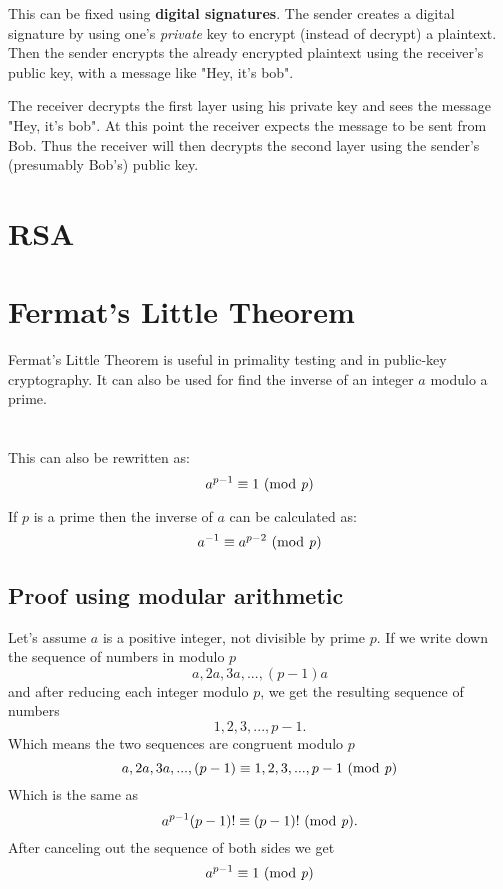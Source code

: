 \documentclass{article}
\begin{document}
	This can be fixed using \textbf{digital signatures}. The sender creates a digital signature by using one's \textit{private} key to encrypt (instead of decrypt) a plaintext. Then the sender encrypts the already encrypted plaintext using the receiver's public key, with a message like "Hey, it's bob". 
	
	The receiver decrypts the first layer using his private key and sees the message "Hey, it's bob". At this point the receiver expects the message to be sent from Bob. Thus the receiver will then decrypts the second layer using the sender's (presumably Bob's) public key. 
	
	\section*{RSA} 
	
	
	\section*{Fermat's Little Theorem} 
	Fermat's Little Theorem is useful in primality testing and in public-key cryptography. It can also be used for find the inverse of  an integer $a$ modulo a prime. \cite{fermatsummary}
	\\
	\\
	\\

	This can also be rewritten as: 
	$$
	a^{p-1} \equiv 1 \text{ (mod \textit{p})}
	$$
	
	If $p$ is a prime then the inverse of $a$ can be calculated as:
	$$
	a^{-1} \equiv a^{p-2} \text{ (mod \textit{p})}
	$$
	
 	\subsection*{Proof using modular arithmetic \cite{fermatproof}}
 	Let's assume $a$ is a positive integer, not divisible by prime $p$. If we write down the sequence of numbers in modulo $p$
 	$$
 	a,2a,3a,...,(p-1)a
 	$$
 	and after reducing each integer modulo $p$, we get the resulting sequence of numbers
 	$$
 	1,2,3,...,p-1.
 	$$
 	Which means the two sequences are congruent modulo $p$ 
 	$$
 	a,2a,3a,...,(p-1) \equiv 1,2,3,...,p-1 \text{ (mod \textit{p})}
 	$$
 	Which is the same as 
 	$$
 	a^{p-1}(p-1)! \equiv (p-1)! \text{ (mod \textit{p})}.
 	$$
 	After canceling out the sequence of both sides we get
 	$$
	a^{p-1} \equiv 1 \text{ (mod \textit{p})}
 	$$
 	
\end{document}
